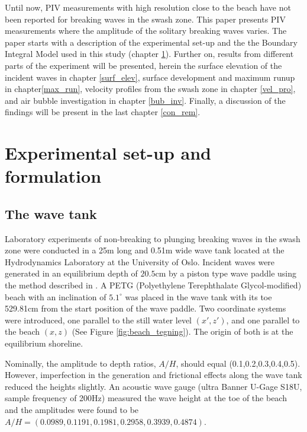 \documentclass[review]{elsarticle}
\begin{document}
Until now, PIV measurements with high resolution close to the beach have not been reported for breaking waves in the swash zone. This paper presents PIV measurements where the amplitude of the solitary breaking waves varies. The paper starts with a description of the experimental set-up and the the Boundary Integral Model used in this study (chapter \ref{experimnetal-set-up}). Further on, results from different parts of the experiment will be presented, herein the surface elevation of the incident waves in chapter \ref{surf_elev}, surface development and maximum runup in chapter\ref{max_run}, velocity profiles from the swash zone in chapter \ref{vel_pro}, and air bubble investigation in chapter \ref{bub_inv}. Finally, a discussion of the findings will be present in the last chapter \ref{con_rem}.

\section{Experimental set-up and formulation}
\label{experimnetal-set-up}

\subsection{The wave tank}
\label{wavetank}

Laboratory experiments of non-breaking to plunging breaking waves in the swash zone were conducted in  a 25m long and 0.51m wide wave tank 
located at the Hydrodynamics Laboratory at the University of Oslo.
Incident waves were generated in an equilibrium depth of $20.5$cm by
a piston type wave paddle using the method described in 
\cite{jensen2003experimental}. 
A PETG (Polyethylene Terephthalate Glycol-modified) beach with an inclination of $5.1^{\circ}$ was placed in the wave tank with its toe 529.81cm from the start position of the wave paddle.   Two coordinate systems were introduced, one parallel to the still water level $(x',z')$, and one parallel to the beach $(x,z)$ (See Figure \ref{fig:beach_tegning}).  The origin of both is at the equilibrium shoreline.

Nominally, the amplitude to depth ratios, $A/H$, should equal (0.1,0.2,0.3,0.4,0.5).  
However, imperfection in the generation and frictional effects along
the wave tank reduced the heights slightly.  
An acoustic wave gauge (ultra Banner U-Gage S18U, sample frequency of 200Hz) measured the wave height at the toe of the beach and the amplitudes were found to be
  $A/H=(0.0989, 0.1191, 0.1981, 0.2958, 0.3939, 0.4874)$.
\end{document}
